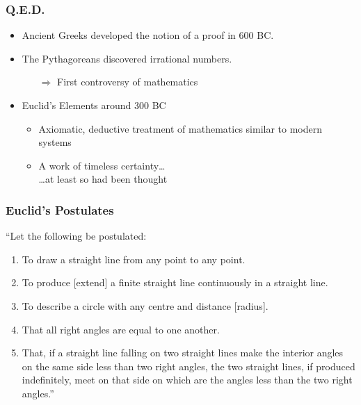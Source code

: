 \documentclass{beamer}
\begin{document}
\begin{frame}
    \frametitle{Q.E.D.}
    \begin{itemize}[<+->]
	\item Ancient Greeks developed the notion of a proof in 600 BC.
	\item The Pythagoreans discovered irrational numbers.
	\begin{itemize}
		\item[$\Rightarrow$] First controversy of mathematics
	\end{itemize}
	\item Euclid's Elements around 300 BC
	\begin{itemize}
		\item Axiomatic, deductive treatment of mathematics similar to modern systems
		\item A work of timeless certainty\ldots\\\pause[\thebeamerpauses]\ldots at least so had been thought
	\end{itemize}
    \end{itemize}
\end{frame}
\begin{frame}
    \frametitle{Euclid's Postulates}
	``Let the following be postulated:\pause
     \begin{enumerate}[<+->]
	\item To draw a straight line from any point to any point.
	\item To produce [extend] a finite straight line continuously in a straight line.
	\item To describe a circle with any centre and distance [radius].
	\item That all right angles are equal to one another.
	\item That, if a straight line falling on two straight lines make the interior angles on the same side less than two right angles, the two straight lines, if produced indefinitely, meet on that side on which are the angles less than the two right angles.''
     \end{enumerate}
\end{frame}
\end{document}
